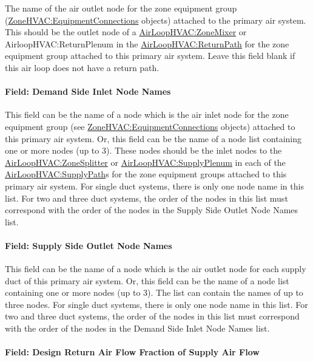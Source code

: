 The name of the air outlet node for the zone equipment group (\hyperref[zonehvacequipmentconnections]{ZoneHVAC:EquipmentConnections} objects) attached to the primary air system. This should be the outlet node of a \hyperref[airloophvaczonemixer]{AirLoopHVAC:ZoneMixer} or AirloopHVAC:ReturnPlenum in the \hyperref[airloophvacreturnpath]{AirLoopHVAC:ReturnPath} for the zone equipment group attached to this primary air system. Leave this field blank if this air loop does not have a return path.

\paragraph{Field: Demand Side Inlet Node Names}\label{field-demand-side-inlet-node-names}

This field can be the name of a node which is the air inlet node for the zone equipment group (see \hyperref[zonehvacequipmentconnections]{ZoneHVAC:EquipmentConnections} objects) attached to this primary air system. Or, this field can be the name of a node list containing one or more nodes (up to 3). These nodes should be the inlet nodes to the \hyperref[airloophvaczonesplitter]{AirLoopHVAC:ZoneSplitter} or \hyperref[airloophvacsupplyplenum]{AirLoopHVAC:SupplyPlenum} in each of the \hyperref[airloophvacsupplypath]{AirLoopHVAC:SupplyPath}s for the zone equipment groups attached to this primary air system. For single duct systems, there is only one node name in this list. For two and three duct systems, the order of the nodes in this list must correspond with the order of the nodes in the Supply Side Outlet Node Names list.

\paragraph{Field: Supply Side Outlet Node Names}\label{field-supply-side-outlet-node-names}

This field can be the name of a node which is the air outlet node for each supply duct of this primary air system. Or, this field can be the name of a node list containing one or more nodes (up to 3). The list can contain the names of up to three nodes. For single duct systems, there is only one node name in this list. For two and three duct systems, the order of the nodes in this list must correspond with the order of the nodes in the Demand Side Inlet Node Names list.

\paragraph{Field: Design Return Air Flow Fraction of Supply Air Flow}\label{design-return-air-flow-fraction-of-supply-air-flow}

